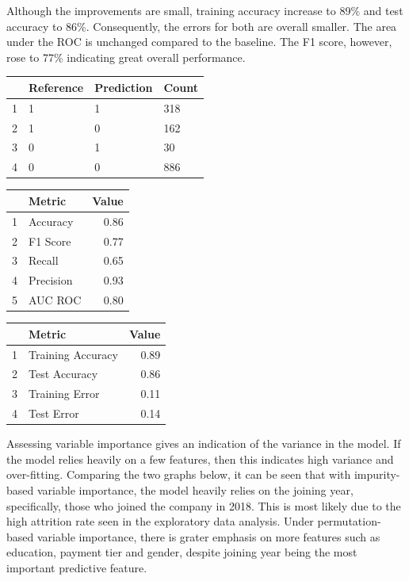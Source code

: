 \documentclass[11pt,preprint, authoryear]{elsarticle}
\let\origtable\table
\let\endorigtable\endtable
\renewenvironment{table}[1][2] {
    \expandafter\origtable\expandafter[H]
} {
    \endorigtable
}
\numberwithin{equation}{section}
\numberwithin{figure}{section}
\numberwithin{table}{section}
\begin{document}
Although the improvements are small, training accuracy increase to 89\%
and test accuracy to 86\%. Consequently, the errors for both are overall
smaller. The area under the ROC is unchanged compared to the baseline.
The F1 score, however, rose to 77\% indicating great overall
performance.

\begin{table}[H]
\centering
\begin{tabular}{rlll}
  \hline
 & Reference & Prediction & Count \\ 
  \hline
1 & 1 & 1 & 318 \\ 
  2 & 1 & 0 & 162 \\ 
  3 & 0 & 1 &  30 \\ 
  4 & 0 & 0 & 886 \\ 
   \hline
\end{tabular}
\caption{Confusion Matrix for Tuned Random Forest \label{tab1}} 
\end{table}

\begin{table}[H]
\centering
\begin{tabular}{rlr}
  \hline
 & Metric & Value \\ 
  \hline
1 & Accuracy & 0.86 \\ 
  2 & F1 Score & 0.77 \\ 
  3 & Recall & 0.65 \\ 
  4 & Precision & 0.93 \\ 
  5 & AUC ROC & 0.80 \\ 
   \hline
\end{tabular}
\caption{Metrics for Tuned Random Forest \label{tab1}} 
\end{table}

\begin{table}[H]
\centering
\begin{tabular}{rlr}
  \hline
 & Metric & Value \\ 
  \hline
1 & Training Accuracy & 0.89 \\ 
  2 & Test Accuracy & 0.86 \\ 
  3 & Training Error & 0.11 \\ 
  4 & Test Error & 0.14 \\ 
   \hline
\end{tabular}
\caption{More Metrics for Tuned Random Forest \label{tab1}} 
\end{table}

Assessing variable importance gives an indication of the variance in the
model. If the model relies heavily on a few features, then this
indicates high variance and over-fitting. Comparing the two graphs
below, it can be seen that with impurity-based variable importance, the
model heavily relies on the joining year, specifically, those who joined
the company in 2018. This is most likely due to the high attrition rate
seen in the exploratory data analysis. Under permutation-based variable
importance, there is grater emphasis on more features such as education,
payment tier and gender, despite joining year being the most important
predictive feature.
\end{document}
